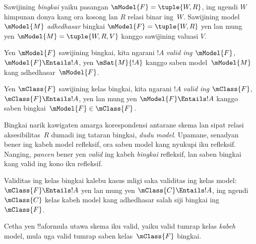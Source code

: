 \documentclass[../../../include/open-logic-section]{subfiles}
\begin{document}


\begin{defn}
  Sawijining \emph{bingkai} yaiku pasangan $\mModel{F} = \tuple{W,R}$,
  ing ngendi $W$ himpunan donya kang ora kosong lan $R$ relasi binar
  ing~$W$. Sawijining model $\mModel{M}$ \emph{adhedhasar} bingkai
  $\mModel{F} = \tuple{W,R}$ yen lan mung yen $\mModel{M} = \tuple{W, R, V}$
  kanggo sawijining valuasi $V$.
\end{defn}

\begin{defn}
  Yen $\mModel{F}$ sawijining bingkai, kita ngarani $!A$ \emph{valid ing
    $\mModel{F}$,} $\mModel{F} \Entails !A$, yen $\mSat{M}{!A}$ kanggo
  saben model~$\mModel{M}$ kang adhedhasar~$\mModel{F}$.
  

Yen $\mClass{F}$ sawijining kelas bingkai, kita ngarani $!A$
  \emph{valid ing $\mClass{F}$,} $\mClass{F} \Entails !A$, yen lan mung
  yen $\mModel{F} \Entails !A$ kanggo saben bingkai~$\mModel{F} \in
  \mClass{F}$.
\end{defn}

Bingkai narik kawigaten amarga korespondensi antarane
skema lan sipat relasi aksesibilitas~$R$ dumadi ing tataran bingkai,
\emph{dudu model}. Upamane, senadyan  bener ing kabeh model
refleksif, ora saben model kang nyukupi  iku refleksif. Nanging,
\emph{pancen} bener yen  \emph{valid} ing kabeh \emph{bingkai}
refleksif, lan saben bingkai kang  valid ing kono iku refleksif.

\begin{rem}
Validitas ing kelas bingkai kalebu kasus mligi saka validitas ing kelas
model: $\mClass{F} \Entails !A$ yen lan mung yen
$\mClass{C} \Entails !A$, ing ngendi $\mClass{C}$ kelas kabeh model
kang adhedhasar salah siji bingkai ing~$\mClass{F}$.

Cetha yen !!a{formula} utawa skema iku valid, yaiku valid
tumrap kelas \emph{kabeh} model, mula uga valid tumrap saben
kelas~$\mClass{F}$ bingkai.
\end{rem}
\end{document}
